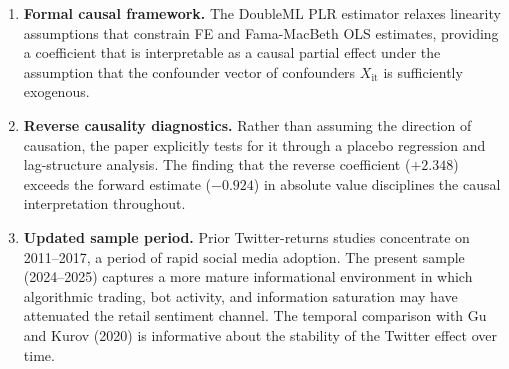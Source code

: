 \begin{enumerate}
\def\labelenumi{\arabic{enumi}.}
\item
  \textbf{Formal causal framework.} The DoubleML PLR estimator relaxes
  linearity assumptions that constrain FE and Fama-MacBeth OLS
  estimates, providing a coefficient that is interpretable as a causal
  partial effect under the assumption that the confounder vector of
  confounders \(X_{\text{it}}\) is sufficiently exogenous.
\item
  \textbf{Reverse causality diagnostics.} Rather than assuming the
  direction of causation, the paper explicitly tests for it through a
  placebo regression and lag-structure analysis. The finding that the
  reverse coefficient (\(+ 2.348\)) exceeds the forward estimate
  (\(- 0.924\)) in absolute value disciplines the causal interpretation
  throughout.
\item
  \textbf{Updated sample period.} Prior Twitter-returns studies
  concentrate on 2011--2017, a period of rapid social media adoption.
  The present sample (2024--2025) captures a more mature informational
  environment in which algorithmic trading, bot activity, and
  information saturation may have attenuated the retail sentiment
  channel. The temporal comparison with Gu and Kurov (2020) is informative about the
  stability of the Twitter effect over time.
\end{enumerate}
